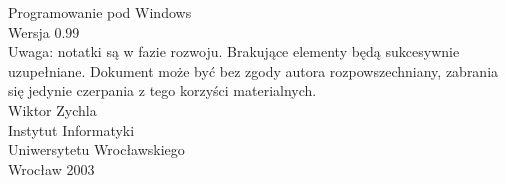 ﻿\begin{titlepage}
\begin{center}
\textsf{
\Huge Programowanie pod Windows\\
\vspace*{1.5cm}
\small Wersja 0.99\\
Uwaga: notatki są w fazie rozwoju. Brakujące elementy będą sukcesywnie uzupełniane. 
Dokument może być bez zgody autora rozpowszechniany, zabrania się jedynie czerpania z tego 
korzyści materialnych.\\
\vspace*{4.5cm}
\Large Wiktor Zychla\\
\vspace{1.5cm}
\Large
Instytut Informatyki\\Uniwersytetu Wrocławskiego\\
\vfill
Wrocław 2003}
\end{center}
\end{titlepage}
